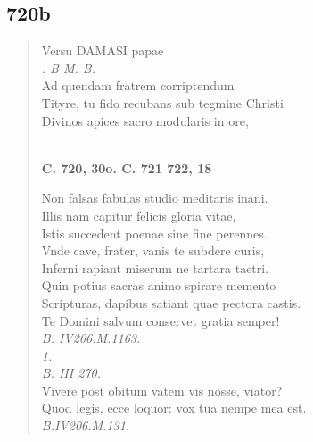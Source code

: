 \documentclass[11pt, a4paper]{report}
\begin{document}
            \subsection*{720b}
      \begin{verse}
      Versu DAMASI papae \\ \textit{. B M. B.} \\ Ad quendam fratrem corriptendum \\ Tityre, tu fido recubans sub tegmine Christi \\ Divinos apices sacro modularis in ore, \\ 
        ﻿\pagebreak 
     \marginpar{[206]} \begin{center} \textbf{C. 720, 30o. C. 721 722, 18} \end{center}Non falsas fabulas studio meditaris inani. \\ Illis nam capitur felicis gloria vitae, \\ Istis succedent poenae sine fine perennes. \\ Vnde cave, frater, vanis te subdere curis, \\ Inferni rapiant miserum ne tartara taetri. \\ Quin potius sacras animo spirare memento \\ Scripturas, dapibus satiant quae pectora castis. \\ Te Domini salvum conservet gratia semper! \\ \textit{B. IV206.M.1163.} \\ \textit{1.} \\ \textit{B. III 270.} \\ Vivere post obitum vatem vis nosse, viator? \\ Quod legis, ecce loquor: vox tua nempe mea est. \\ \textit{B.IV206.M.131.} \\ 
      \end{verse}
  
\end{document}
